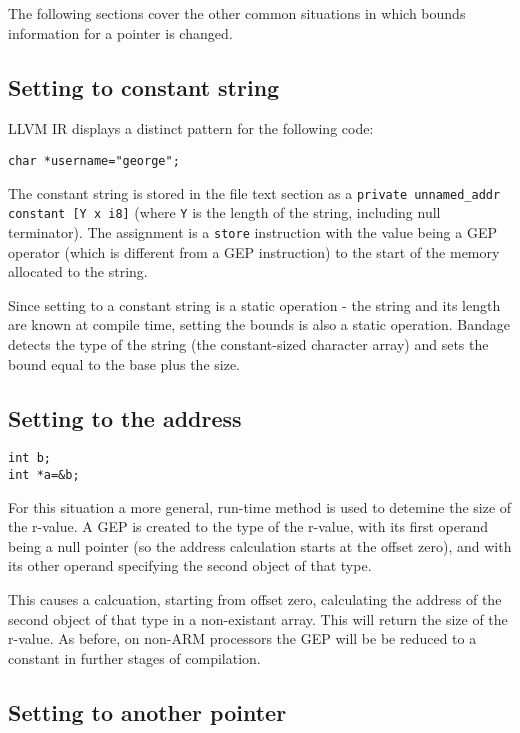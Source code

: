 The following sections cover the other common situations in which bounds information for a pointer is changed.

\subsection{Setting to constant string}

LLVM IR displays a distinct pattern for the following code:

\begin{verbatim}
char *username="george";
\end{verbatim}

The constant string is stored in the file text section as a \verb!private unnamed_addr constant [Y x i8]! (where \verb!Y! is the length of the string, including null terminator).
The assignment is a \verb!store! instruction with the value being a GEP operator (which is different from a GEP instruction) to the start of the memory allocated to the string.

Since setting to a constant string is a static operation - the string and its length are known at compile time, setting the bounds is also a static operation.
Bandage detects the type of the string (the constant-sized character array) and sets the bound equal to the base plus the size.

\subsection{Setting to the address}

\begin{verbatim}
int b;
int *a=&b;
\end{verbatim}

For this situation a more general, run-time method is used to detemine the size of the r-value.
A GEP is created to the type of the r-value, with its first operand being a null pointer (so the address calculation starts at the offset zero), and with its other operand specifying the second object of that type.

This causes a calcuation, starting from offset zero, calculating the address of the second object of that type in a non-existant array.
This will return the size of the r-value.
As before, on non-ARM processors the GEP will be be reduced to a constant in further stages of compilation.

\subsection{Setting to another pointer}

